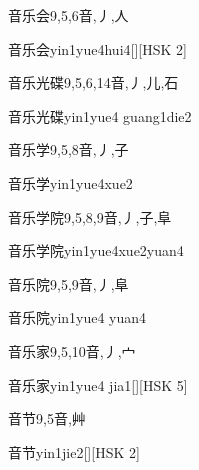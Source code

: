 \begin{Entry}{音乐会}{9,5,6}{⾳,⼃,⼈}
  \begin{Phonetics}{音乐会}{yin1yue4hui4}[][HSK 2]
  \end{Phonetics}
\end{Entry}

\begin{Entry}{音乐光碟}{9,5,6,14}{⾳,⼃,⼉,⽯}
  \begin{Phonetics}{音乐光碟}{yin1yue4 guang1die2}
  \end{Phonetics}
\end{Entry}

\begin{Entry}{音乐学}{9,5,8}{⾳,⼃,⼦}
  \begin{Phonetics}{音乐学}{yin1yue4xue2}
  \end{Phonetics}
\end{Entry}

\begin{Entry}{音乐学院}{9,5,8,9}{⾳,⼃,⼦,⾩}
  \begin{Phonetics}{音乐学院}{yin1yue4xue2yuan4}
  \end{Phonetics}
\end{Entry}

\begin{Entry}{音乐院}{9,5,9}{⾳,⼃,⾩}
  \begin{Phonetics}{音乐院}{yin1yue4 yuan4}
  \end{Phonetics}
\end{Entry}

\begin{Entry}{音乐家}{9,5,10}{⾳,⼃,⼧}
  \begin{Phonetics}{音乐家}{yin1yue4 jia1}[][HSK 5]
  \end{Phonetics}
\end{Entry}

\begin{Entry}{音节}{9,5}{⾳,⾋}
  \begin{Phonetics}{音节}{yin1jie2}[][HSK 2]
  \end{Phonetics}
\end{Entry}

